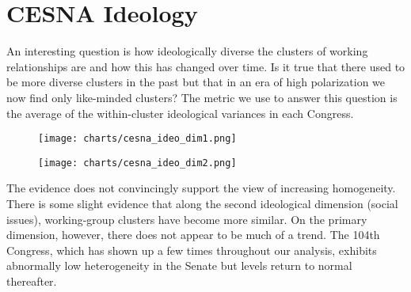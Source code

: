 \section{CESNA Ideology}

An interesting question is how ideologically diverse the clusters of working relationships are and how this has changed over time. Is it true that there used to be more diverse clusters in the past but that in an era of high polarization we now find only like-minded clusters? The metric we use to answer this question is the average of the within-cluster ideological variances in each Congress.

\begin{figure}[htbp]
  \centering
  \begin{minipage}[h]{0.4\textwidth}
    \texttt{[image: charts/cesna\_ideo\_dim1.png]}
  \end{minipage}
  \hfill
  \begin{minipage}[h]{0.4\textwidth}
    \texttt{[image: charts/cesna\_ideo\_dim2.png]}
  \end{minipage}
\end{figure}

The evidence does not convincingly support the view of increasing homogeneity. There is some slight evidence that along the second ideological dimension (social issues), working-group clusters have become more similar. On the primary dimension, however, there does not appear to be much of a trend. The 104th Congress, which has shown up a few times throughout our analysis, exhibits abnormally low heterogeneity in the Senate but levels return to normal thereafter. 